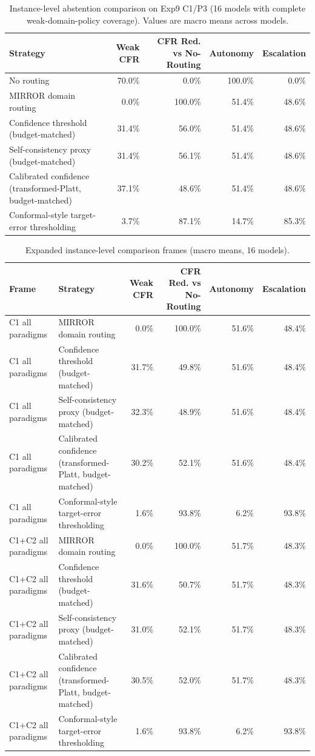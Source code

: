 \documentclass[10pt]{article}
\begin{document}
\begin{table}[h]
\centering
\caption{Instance-level abstention comparison on Exp9 C1/P3 (16 models with complete weak-domain-policy coverage). Values are macro means across models.}
\label{tab:instance-baselines}
\small
\begin{tabular}{lrrrr}
\toprule
Strategy & Weak CFR & CFR Red. vs No-Routing & Autonomy & Escalation \\
\midrule
No routing & 70.0\% & 0.0\% & 100.0\% & 0.0\% \\
MIRROR domain routing & 0.0\% & 100.0\% & 51.4\% & 48.6\% \\
Confidence threshold (budget-matched) & 31.4\% & 56.0\% & 51.4\% & 48.6\% \\
Self-consistency proxy (budget-matched) & 31.4\% & 56.1\% & 51.4\% & 48.6\% \\
Calibrated confidence (transformed-Platt, budget-matched) & 37.1\% & 48.6\% & 51.4\% & 48.6\% \\
Conformal-style target-error thresholding & 3.7\% & 87.1\% & 14.7\% & 85.3\% \\
\bottomrule
\end{tabular}
\end{table}

\begin{table}[h]
\centering
\caption{Expanded instance-level comparison frames (macro means, 16 models).}
\label{tab:instance-baselines-expanded}
\small
\begin{tabular}{llrrrr}
\toprule
Frame & Strategy & Weak CFR & CFR Red. vs No-Routing & Autonomy & Escalation \\
\midrule
C1 all paradigms & MIRROR domain routing & 0.0\% & 100.0\% & 51.6\% & 48.4\% \\
C1 all paradigms & Confidence threshold (budget-matched) & 31.7\% & 49.8\% & 51.6\% & 48.4\% \\
C1 all paradigms & Self-consistency proxy (budget-matched) & 32.3\% & 48.9\% & 51.6\% & 48.4\% \\
C1 all paradigms & Calibrated confidence (transformed-Platt, budget-matched) & 30.2\% & 52.1\% & 51.6\% & 48.4\% \\
C1 all paradigms & Conformal-style target-error thresholding & 1.6\% & 93.8\% & 6.2\% & 93.8\% \\
\midrule
C1+C2 all paradigms & MIRROR domain routing & 0.0\% & 100.0\% & 51.7\% & 48.3\% \\
C1+C2 all paradigms & Confidence threshold (budget-matched) & 31.6\% & 50.7\% & 51.7\% & 48.3\% \\
C1+C2 all paradigms & Self-consistency proxy (budget-matched) & 31.0\% & 52.1\% & 51.7\% & 48.3\% \\
C1+C2 all paradigms & Calibrated confidence (transformed-Platt, budget-matched) & 30.5\% & 52.0\% & 51.7\% & 48.3\% \\
C1+C2 all paradigms & Conformal-style target-error thresholding & 1.6\% & 93.8\% & 6.2\% & 93.8\% \\
\bottomrule
\end{tabular}
\end{table}
\end{document}
